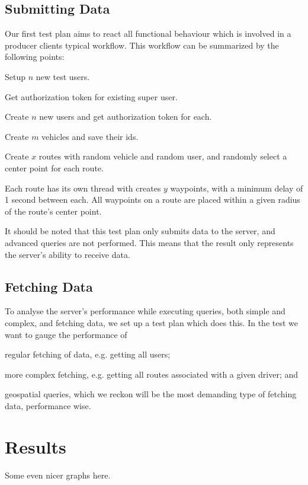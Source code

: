 \subsection{Submitting Data}
Our first test plan aims to react all functional behaviour which is involved in a producer clients typical workflow.
This workflow can be summarized by the following points:
\begin{enumberate}
    \item Setup $n$ new test users.
    \begin{enumberate}
        \item Get authorization token for existing super user.
        \item Create $n$ new users and get authorization token for each.
    \end{enumberate}
    \item Create $m$ vehicles and save their ids.
    \item Create $x$ routes with random vehicle and random user, and randomly select a center point for each route.
    \item Each route has its own thread with creates $y$ waypoints, with a minimum delay of 1 second between each. All waypoints on a route are placed within a given radius of the route's center point.
\end{enumberate}

It should be noted that this test plan only submits data to the server, and advanced queries are not performed.
This means that the result only represents the server's ability to receive data.

\subsection{Fetching Data}
To analyse the server's performance while executing queries, both simple and complex, and fetching data, we set up a test plan which does this.
In the test we want to gauge the performance of
\begin{enumberate*}
    \item regular fetching of data, e.g. getting all users;
    \item more complex fetching, e.g. getting all routes associated with a given driver; and
    \item geospatial queries, which we reckon will be the most demanding type of fetching data, performance wise.
\end{enumberate*}

\section{Results}
Some even nicer graphs here.

